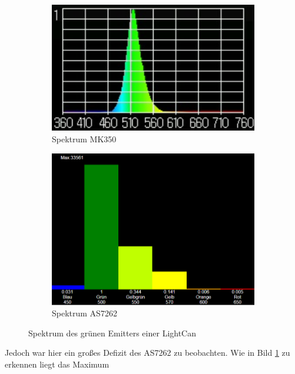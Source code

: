\documentclass[11pt]{scrartcl}
\begin{document}
\begin{figure}[H]
    \centering
    \begin{subfigure}[b]{0.49\textwidth}
        \includegraphics[width=\textwidth]{images/mk350_lightcan_green_spectrum.png}
        \caption{Spektrum MK350}\label{fig:green_spec_MK350}
    \end{subfigure}
    \hfill 
    \begin{subfigure}[b]{0.49\textwidth}
        \includegraphics[width=\textwidth]{images/app_lightcan_green_spectrum.png}
        \caption{Spektrum AS7262}\label{fig:green_spec_7262}
    \end{subfigure}
    \caption{Spektrum des grünen Emitters einer LightCan}
\end{figure}
\noindent
Jedoch war hier ein großes Defizit des AS7262 zu beobachten. Wie in Bild  \ref{fig:green_spec_MK350} zu erkennen liegt das Maximum
\end{document}
